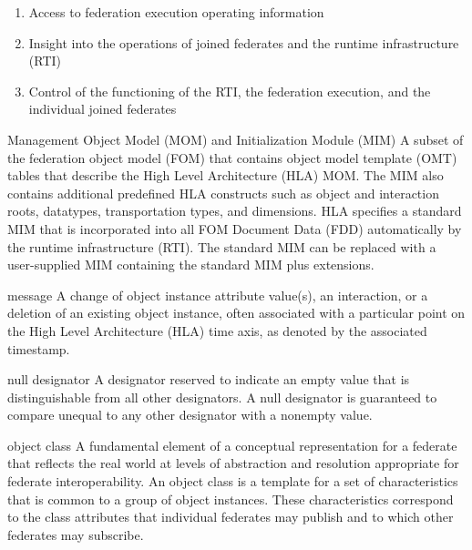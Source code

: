\begin{enumerate}[label=\alph*)]
\item Access to federation execution operating information
\item Insight into the operations of joined federates and the runtime infrastructure (RTI)
\item Control of the functioning of the RTI, the federation execution, and the individual joined federates
\end{enumerate}

\newpage
\begin{definition}{Management Object Model (MOM) and Initialization Module (MIM)}
    A subset of the federation object model (FOM) that contains object model template (OMT) tables that describe the High Level Architecture (HLA) MOM. The MIM also contains additional predefined HLA constructs such as object and interaction roots, datatypes, transportation types, and dimensions. HLA specifies a standard MIM that is incorporated into all FOM Document Data (FDD) automatically by the runtime infrastructure (RTI). The standard MIM can be replaced with a user-supplied MIM containing the standard MIM plus extensions.
\end{definition}

\begin{definition}{message}
    A change of object instance attribute value(s), an interaction, or a deletion of an existing object instance, often associated with a particular point on the High Level Architecture (HLA) time axis, as denoted by the associated timestamp.
\end{definition}

\begin{definition}{null designator}
    A designator reserved to indicate an empty value that is distinguishable from all other designators. A null designator is guaranteed to compare unequal to any other designator with a nonempty value.
\end{definition}

\begin{definition}{object class}
    A fundamental element of a conceptual representation for a federate that reflects the real world at levels of abstraction and resolution appropriate for federate interoperability. An object class is a template for a set of characteristics that is common to a group of object instances. These characteristics correspond to the class attributes that individual federates may publish and to which other federates may subscribe.
\end{definition}

